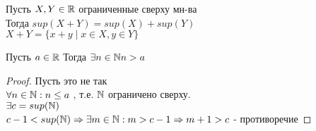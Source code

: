 \begin{theorem}
	Пусть $ X, Y \in \mathbb{R} $ ограниченные сверху мн-ва\\
	Тогда $sup(X+Y) = sup(X) + sup(Y)$ \\
	$ X + Y = \{ x + y \mid x \in X, y \in Y \} $
	\begin{consequence}
		Пусть $ a \in \mathbb{R} $  Тогда  $\exists n \in \mathbb{N} n > a $ 
		\begin{proof}
			Пусть это не так \\
			$ \forall n \in \mathbb{N} : n \leq a $ , т.е. $ \mathbb{N} $ ограничено сверху. \\
			$ \exists c = sup(\mathbb{N}) $ \\
			$ c - 1 < sup (\mathbb{N})  \Rightarrow \exists m \in \mathbb{N} : m > c - 1 \Rightarrow m + 1 > c$ - противоречие 
		\end{proof}
	\end{consequence}
\end{theorem}









